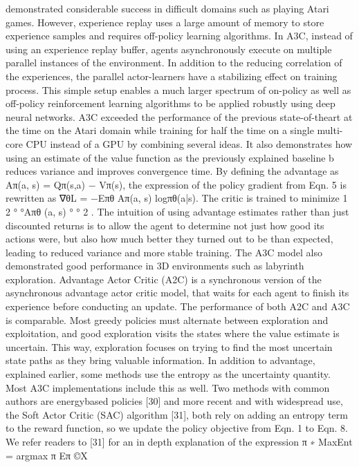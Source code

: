 demonstrated considerable success in difficult domains such
as playing Atari games. However, experience replay uses a
large amount of memory to store experience samples and
requires off-policy learning algorithms. In A3C, instead of
using an experience replay buffer, agents asynchronously
execute on multiple parallel instances of the environment. In
addition to the reducing correlation of the experiences, the
parallel actor-learners have a stabilizing effect on training
process. This simple setup enables a much larger spectrum
of on-policy as well as off-policy reinforcement learning
algorithms to be applied robustly using deep neural networks.
A3C exceeded the performance of the previous state-of-theart at the time on the Atari domain while training for half
the time on a single multi-core CPU instead of a GPU by
combining several ideas. It also demonstrates how using an
estimate of the value function as the previously explained
baseline b reduces variance and improves convergence time.
By defining the advantage as Aπ(a, s) = Qπ(s,a) − Vπ(s), the
expression of the policy gradient from Eqn. 5 is rewritten
as ∇θL = −Eπθ
{Aπ(a, s) logπθ(a|s)}. The critic is trained to
minimize 1
2
°
°Aπθ
(a, s)
°
°
2
. The intuition of using advantage
estimates rather than just discounted returns is to allow the
agent to determine not just how good its actions were, but also
how much better they turned out to be than expected, leading
to reduced variance and more stable training. The A3C model
also demonstrated good performance in 3D environments such
as labyrinth exploration. Advantage Actor Critic (A2C) is
a synchronous version of the asynchronous advantage actor
critic model, that waits for each agent to finish its experience
before conducting an update. The performance of both A2C
and A3C is comparable. Most greedy policies must alternate
between exploration and exploitation, and good exploration
visits the states where the value estimate is uncertain. This
way, exploration focuses on trying to find the most uncertain
state paths as they bring valuable information. In addition to
advantage, explained earlier, some methods use the entropy as
the uncertainty quantity. Most A3C implementations include
this as well. Two methods with common authors are energybased policies [30] and more recent and with widespread use,
the Soft Actor Critic (SAC) algorithm [31], both rely on adding
an entropy term to the reward function, so we update the policy
objective from Eqn. 1 to Eqn. 8. We refer readers to [31] for
an in depth explanation of the expression
π
∗
MaxEnt = argmax
π
Eπ
©X
